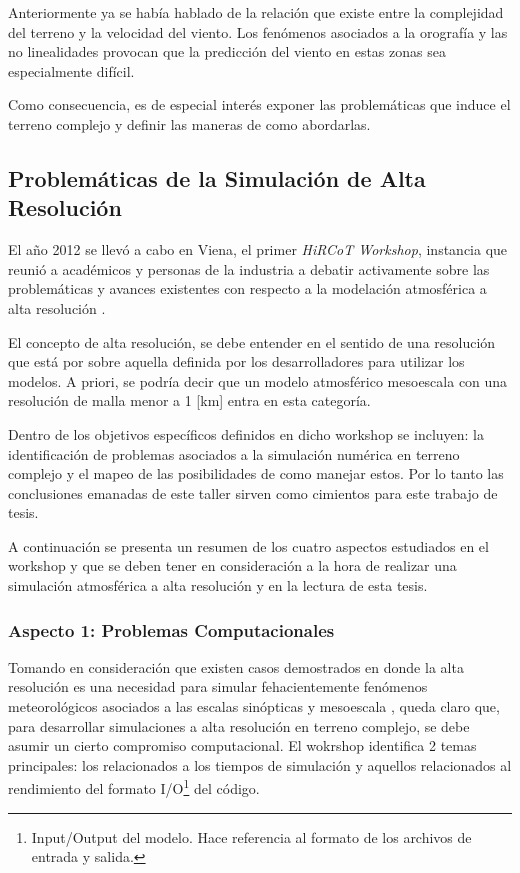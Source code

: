 Anteriormente ya se había hablado de la relación que existe entre la complejidad del terreno y la velocidad del viento. Los fenómenos asociados a la orografía y las no linealidades provocan que la predicción del viento en estas zonas sea especialmente difícil. 

Como consecuencia, es de especial interés exponer las problemáticas que induce el terreno complejo y definir las maneras de como abordarlas.
\subsection{Problemáticas de la Simulación de Alta Resolución}
El año 2012 se llevó a cabo en Viena, el primer \emph{HiRCoT Workshop}, instancia que reunió a académicos y personas de la industria a debatir activamente sobre las problemáticas y avances existentes con respecto a la modelación atmosférica a alta resolución \citep{arnold2012high}.

El concepto de alta resolución, se debe entender en el sentido de una resolución que está por sobre aquella definida por los desarrolladores para utilizar los modelos. A priori, se podría decir que un modelo atmosférico mesoescala con una resolución de malla menor a 1 [km] entra en esta categoría.

Dentro de los objetivos específicos definidos en dicho workshop se incluyen: la identificación de problemas asociados a la simulación numérica en terreno complejo y el mapeo de las posibilidades de como manejar estos. Por lo tanto las conclusiones emanadas de este taller sirven como cimientos para este trabajo de tesis.

A continuación se presenta un resumen de los cuatro aspectos estudiados en el workshop y que se deben tener en consideración a la hora de realizar una simulación atmosférica a alta resolución y en la lectura de esta tesis.

\subsubsection{Aspecto 1: Problemas Computacionales}
Tomando en consideración que existen casos demostrados en donde la alta resolución es una necesidad para simular fehacientemente fenómenos meteorológicos asociados a las escalas sinópticas y mesoescala \citep{morton2007tradeoffs,stevens2010using}, queda claro que, para desarrollar simulaciones a alta resolución en terreno complejo, se debe asumir un cierto compromiso computacional. El wokrshop identifica 2 temas principales: los relacionados a los tiempos de simulación y aquellos relacionados al rendimiento del formato I/O\footnote{Input/Output del modelo. Hace referencia al formato de los archivos de entrada y salida.} del código.

